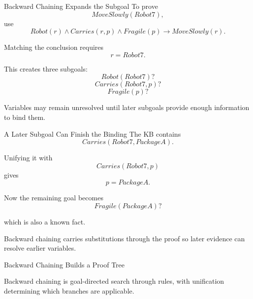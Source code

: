 \documentclass[aspectratio=169,10pt]{beamer}
\begin{document}
\begin{frame}[shrink=10]{Backward Chaining Expands the Subgoal}
  To prove
  \[
    MoveSlowly(Robot7),
  \]
  use
  \[
    Robot(r)\land Carries(r,p)\land Fragile(p)
    \rightarrow MoveSlowly(r).
  \]

  Matching the conclusion requires
  \[
    r=Robot7.
  \]

  This creates three subgoals:
  \[
    Robot(Robot7)?
  \]
  \[
    Carries(Robot7,p)?
  \]
  \[
    Fragile(p)?
  \]

  \begin{keyidea}
    Variables may remain unresolved until later subgoals provide enough information to bind them.
  \end{keyidea}
\end{frame}

\begin{frame}[shrink=10]{A Later Subgoal Can Finish the Binding}
  The KB contains
  \[
    Carries(Robot7,PackageA).
  \]

  Unifying it with
  \[
    Carries(Robot7,p)
  \]
  gives
  \[
    p=PackageA.
  \]

  Now the remaining goal becomes
  \[
    Fragile(PackageA)?
  \]

  which is also a known fact.

  \begin{keyidea}
    Backward chaining carries substitutions through the proof so later evidence can resolve earlier variables.
  \end{keyidea}
\end{frame}

\begin{frame}[shrink=10]{Backward Chaining Builds a Proof Tree}
  \begin{center}
  \end{center}

  \begin{keyidea}
    Backward chaining is goal-directed search through rules, with unification determining which branches are applicable.
  \end{keyidea}
\end{frame}
\end{document}
